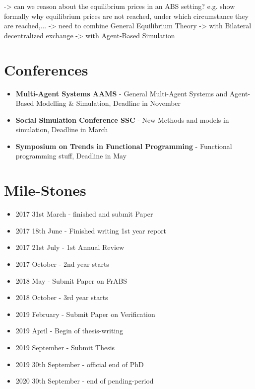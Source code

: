-> can we reason about the equilibrium prices in an ABS setting? e.g. show formally why equilibrium prices are not reached, under which circumstance they are reached,...
			-> need to combine General Equilibrium Theory
			-> with Bilateral decentralized exchange
			-> with Agent-Based Simulation 
			
\section{Conferences}
\begin{itemize}
	\item \textbf{Multi-Agent Systems AAMS} - General Multi-Agent Systems and Agent-Based Modelling \& Simulation, Deadline in November
	\item \textbf{Social Simulation Conference SSC} - New Methods and models in simulation, Deadline in March
	\item \textbf{Symposium on Trends in Functional Programming} - Functional programming stuff, Deadline in May
\end{itemize}

\section{Mile-Stones}
\begin{itemize}
	\item 2017 31st March - finished and submit Paper 
	\item 2017 18th June - Finished writing 1st year report 
	\item 2017 21st July - 1st Annual Review
	\item 2017 October - 2nd year starts
	\item 2018 May - Submit Paper on FrABS
	\item 2018 October - 3rd year starts
	\item 2019 February - Submit Paper on Verification
	\item 2019 April - Begin of thesis-writing
	\item 2019 September - Submit Thesis
	\item 2019 30th September - official end of PhD
	\item 2020 30th September - end of pending-period
\end{itemize}

